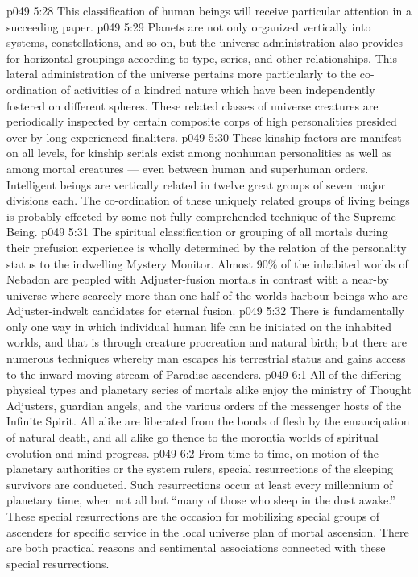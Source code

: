 \vs p049 5:28 This classification of human beings will receive particular attention in a succeeding paper.
\vs p049 5:29 \bibnobreakspace {} Planets are not only organized vertically into systems, constellations, and so on, but the universe administration also provides for horizontal groupings according to type, series, and other relationships. This lateral administration of the universe pertains more particularly to the co\hyp{}ordination of activities of a kindred nature which have been independently fostered on different spheres. These related classes of universe creatures are periodically inspected by certain composite corps of high personalities presided over by long\hyp{}experienced finaliters.
\vs p049 5:30 These kinship factors are manifest on all levels, for kinship serials exist among nonhuman personalities as well as among mortal creatures --- even between human and superhuman orders. Intelligent beings are vertically related in twelve great groups of seven major divisions each. The co\hyp{}ordination of these uniquely related groups of living beings is probably effected by some not fully comprehended technique of the Supreme Being.
\vs p049 5:31 \bibnobreakspace {} The spiritual classification or grouping of all mortals during their prefusion experience is wholly determined by the relation of the personality status to the indwelling Mystery Monitor. Almost 90\% of the inhabited worlds of Nebadon are peopled with Adjuster\hyp{}fusion mortals in contrast with a near-by universe where scarcely more than one half of the worlds harbour beings who are Adjuster\hyp{}indwelt candidates for eternal fusion.
\vs p049 5:32 \bibnobreakspace {} There is fundamentally only one way in which individual human life can be initiated on the inhabited worlds, and that is through creature procreation and natural birth; but there are numerous techniques whereby man escapes his terrestrial status and gains access to the inward moving stream of Paradise ascenders.
\vs p049 6:1 All of the differing physical types and planetary series of mortals alike enjoy the ministry of Thought Adjusters, guardian angels, and the various orders of the messenger hosts of the Infinite Spirit. All alike are liberated from the bonds of flesh by the emancipation of natural death, and all alike go thence to the morontia worlds of spiritual evolution and mind progress.
\vs p049 6:2 From time to time, on motion of the planetary authorities or the system rulers, special resurrections of the sleeping survivors are conducted. Such resurrections occur at least every millennium of planetary time, when not all but “many of those who sleep in the dust awake.” These special resurrections are the occasion for mobilizing special groups of ascenders for specific service in the local universe plan of mortal ascension. There are both practical reasons and sentimental associations connected with these special resurrections.
